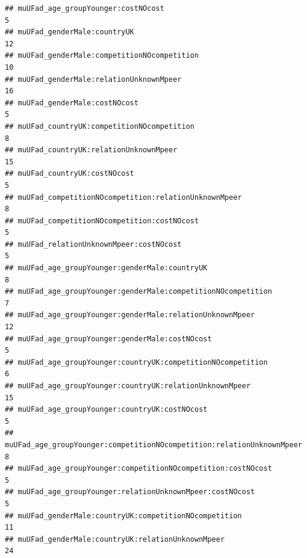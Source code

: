 \documentclass[
]{article}
\begin{document}
\begin{verbatim}
## muUFad_age_groupYounger:costNOcost                                                                            5
## muUFad_genderMale:countryUK                                                                                  12
## muUFad_genderMale:competitionNOcompetition                                                                   10
## muUFad_genderMale:relationUnknownMpeer                                                                       16
## muUFad_genderMale:costNOcost                                                                                  5
## muUFad_countryUK:competitionNOcompetition                                                                     8
## muUFad_countryUK:relationUnknownMpeer                                                                        15
## muUFad_countryUK:costNOcost                                                                                   5
## muUFad_competitionNOcompetition:relationUnknownMpeer                                                          8
## muUFad_competitionNOcompetition:costNOcost                                                                    5
## muUFad_relationUnknownMpeer:costNOcost                                                                        5
## muUFad_age_groupYounger:genderMale:countryUK                                                                  8
## muUFad_age_groupYounger:genderMale:competitionNOcompetition                                                   7
## muUFad_age_groupYounger:genderMale:relationUnknownMpeer                                                      12
## muUFad_age_groupYounger:genderMale:costNOcost                                                                 5
## muUFad_age_groupYounger:countryUK:competitionNOcompetition                                                    6
## muUFad_age_groupYounger:countryUK:relationUnknownMpeer                                                       15
## muUFad_age_groupYounger:countryUK:costNOcost                                                                  5
## muUFad_age_groupYounger:competitionNOcompetition:relationUnknownMpeer                                         8
## muUFad_age_groupYounger:competitionNOcompetition:costNOcost                                                   5
## muUFad_age_groupYounger:relationUnknownMpeer:costNOcost                                                       5
## muUFad_genderMale:countryUK:competitionNOcompetition                                                         11
## muUFad_genderMale:countryUK:relationUnknownMpeer                                                             24

\end{verbatim}
\end{document}
